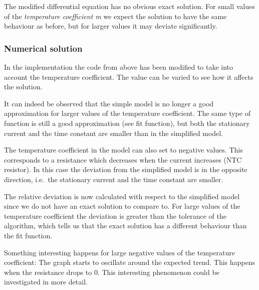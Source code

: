 \documentclass[11pt]{article}
\begin{document}
The modified differential equation has no obvious exact solution. For
small values of the \emph{temperature coefficient m} we expect the
solution to have the same behaviour as before, but for larger values it
may deviate significantly.

\hypertarget{numerical-solution}{%
\subsubsection{Numerical solution}\label{numerical-solution}}

In the implementation the code from above has been modified to take into
account the temperature coefficient. The value can be varied to see how
it affects the solution.

It can indeed be observed that the simple model is no longer a good
approximation for larger values of the temperature coefficient. The same
type of function is still a good approximation (see fit function), but
both the stationary current and the time constant are smaller than in
the simplified model.

The temperature coefficient in the model can also set to negative
values. This corresponds to a resistance which decreases when the
current increases (NTC resistor). In this case the deviation from the
simplified model is in the opposite direction, i.e.~the stationary
current and the time constant are smaller.

The relative deviation is now calculated with respect to the simplified
model since we do not have an exact solution to compare to. For large
values of the temperature coefficient the deviation is greater than the
tolerance of the algorithm, which tells us that the exact solution has a
different behaviour than the fit function.

Something interesting happens for large negative values of the
temperature coefficient: The graph starts to oscillate around the
expected trend. This happens when the resistance drops to 0. This
interesting phenomenon could be investigated in more detail.
\end{document}
